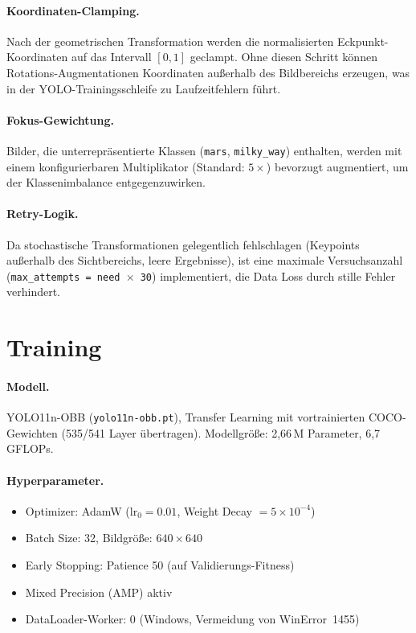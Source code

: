 \documentclass[a4paper, 11pt]{scrartcl}
\begin{document}
\paragraph{Koordinaten-Clamping.}
Nach der geometrischen Transformation werden die normalisierten Eckpunkt-Koordinaten auf das Intervall $[0, 1]$ geclampt.
Ohne diesen Schritt können Rotations-Augmentationen Koordinaten außerhalb des Bildbereichs erzeugen, was in der YOLO-Trainingsschleife zu Laufzeitfehlern führt.

\paragraph{Fokus-Gewichtung.}
Bilder, die unterrepräsentierte Klassen (\texttt{mars}, \texttt{milky\_way}) enthalten, werden mit einem konfigurierbaren Multiplikator (Standard: $5\times$) bevorzugt augmentiert, um der Klassenimbalance entgegenzuwirken.

\paragraph{Retry-Logik.}
Da stochastische Transformationen gelegentlich fehlschlagen (Keypoints außerhalb des Sichtbereichs, leere Ergebnisse), ist eine maximale Versuchsanzahl (\texttt{max\_attempts = need $\times$ 30}) implementiert, die Data Loss durch stille Fehler verhindert.

\section{Training}
\label{sec:training}

\paragraph{Modell.}
YOLO11n-OBB (\texttt{yolo11n-obb.pt}), Transfer Learning mit vortrainierten COCO-Gewichten (535/541 Layer übertragen).
Modellgröße: 2,66\,M Parameter, 6,7 GFLOPs.

\paragraph{Hyperparameter.}
\begin{itemize}
    \item Optimizer: AdamW ($\text{lr}_0 = 0.01$, Weight Decay $= 5 \times 10^{-4}$)
    \item Batch Size: 32, Bildgröße: $640 \times 640$
    \item Early Stopping: Patience 50 (auf Validierungs-Fitness)
    \item Mixed Precision (AMP) aktiv
    \item DataLoader-Worker: 0 (Windows, Vermeidung von WinError~1455)
\end{itemize}
\end{document}
